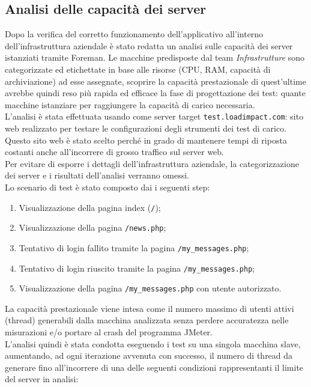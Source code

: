 \subsection{Analisi delle capacità dei server}
Dopo la verifica del corretto funzionamento dell'applicativo all'interno dell'infrastruttura aziendale è stato redatta un analisi sulle capacità dei server istanziati tramite Foreman. Le macchine predisposte dal team \textit{Infrastrutture} sono categorizzate ed etichettate in base alle risorse (CPU, RAM, capacità di archiviazione) ad esse assegnate, scoprire la capacità prestazionale di quest'ultime avrebbe quindi reso più rapida ed efficace la fase di progettazione dei test: quante macchine istanziare per raggiungere la capacità di carico necessaria. \\ 
L'analisi è stata effettuata usando come server target \texttt{test.loadimpact.com}: sito web realizzato per testare le configurazioni degli strumenti dei test di carico. Questo sito web è stato scelto perché in grado di mantenere tempi di riposta costanti anche all'incorrere di grosso traffico sul server web.\\
Per evitare di esporre i dettagli dell'infrastruttura aziendale, la categorizzazione dei server e i risultati dell'analisi verranno omessi.\\
Lo scenario di test è stato composto dai i seguenti step:
\begin{enumerate}
	\item Visualizzazione della pagina index (\texttt{/});
	\item Visualizzazione della pagina \texttt{/news.php};
	\item Tentativo di login fallito tramite la pagina \texttt{/my\_messages.php};
	\item Tentativo di login riuscito tramite la pagina \texttt{/my\_messages.php};
	\item Visualizzazione della pagina \texttt{/my\_messages.php} con utente autorizzato.
\end{enumerate}
La capacità prestazionale viene intesa come il numero massimo di utenti attivi (thread) generabili dalla macchina analizzata senza perdere accuratezza nelle misurazioni e/o portare al \gls{crash} del programma JMeter.\\ 
L'analisi quindi è stata condotta eseguendo i test su una singola macchina slave, aumentando, ad ogni iterazione avvenuta con successo, il numero di thread da generare fino all'incorrere di una delle seguenti condizioni rappresentanti il limite del server in analisi:
